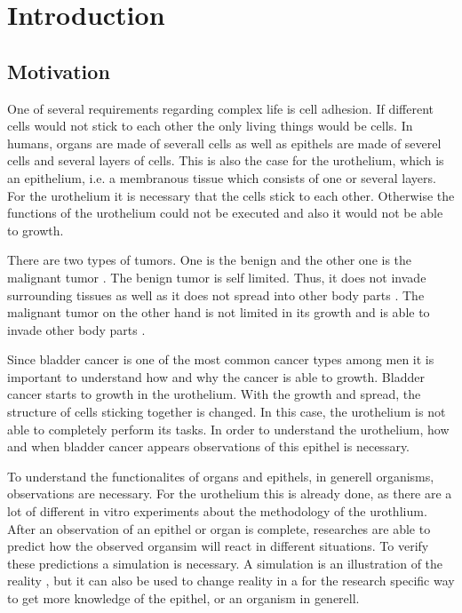 \chapter{Introduction}
\section{Motivation}
One of several requirements regarding complex life is cell adhesion. If different cells would not stick to each other the only living things would be cells. 
In humans, organs are made of severall cells as well as epithels are made of severel cells and several layers of cells. This is also the case for the urothelium, which is an epithelium, i.e. a membranous tissue which consists of one or several layers. For the urothelium it is necessary that the cells stick to each other. Otherwise the functions of the urothelium could not be executed and also it would not be able to growth.%

There are two types of tumors. One is the benign and the other one is the malignant tumor \cite{Poplawski2009}. The benign tumor is self limited. Thus, it does not invade surrounding tissues as well as it does not spread into other body parts \cite{Poplawski2009}. The malignant tumor on the other hand is not limited in its growth and is able to invade other body parts \cite{Poplawski2009}. 

Since bladder cancer is one of the most common cancer types among men it is important to understand how and why the cancer is able to growth. \newline
Bladder cancer starts to growth in the urothelium. With the growth and spread, the structure of cells sticking together is changed. In this case, the urothelium is not able to completely perform its tasks. In order to understand the urothelium, how and when bladder cancer appears observations of this epithel is necessary. 

To understand the functionalites of organs and epithels, in generell organisms, observations are necessary. For the urothelium this is already done, as there are a lot of different in vitro experiments about the methodology of the urothlium. After an observation of an epithel or organ is complete, researches are able to predict how the observed organsim will react in different situations. To verify these predictions a simulation is necessary. A simulation is an illustration of the reality \cite{REF}, but it can also be used to change reality in a for the research specific way to get more knowledge of the epithel, or an organism in generell.

